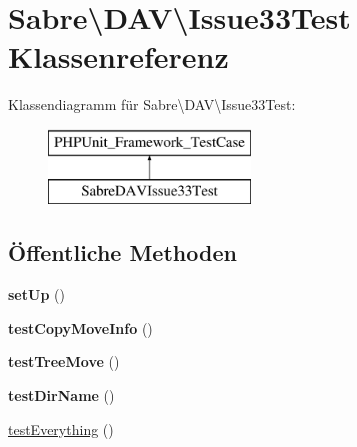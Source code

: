 \hypertarget{class_sabre_1_1_d_a_v_1_1_issue33_test}{}\section{Sabre\textbackslash{}D\+AV\textbackslash{}Issue33\+Test Klassenreferenz}
\label{class_sabre_1_1_d_a_v_1_1_issue33_test}
Klassendiagramm für Sabre\textbackslash{}D\+AV\textbackslash{}Issue33\+Test\+:\begin{figure}[H]
\begin{center}
\leavevmode
\includegraphics[height=2.000000cm]{class_sabre_1_1_d_a_v_1_1_issue33_test}
\end{center}
\end{figure}
\subsection*{Öffentliche Methoden}
\begin{DoxyCompactItemize}
\item 
\mbox{\label{class_sabre_1_1_d_a_v_1_1_issue33_test_a3ae19b56f26791c9a43c4fb60eb90247}} 
{\bfseries set\+Up} ()
\item 
\mbox{\label{class_sabre_1_1_d_a_v_1_1_issue33_test_ab1afb974b04114c0854b4436a696520f}} 
{\bfseries test\+Copy\+Move\+Info} ()
\item 
\mbox{\label{class_sabre_1_1_d_a_v_1_1_issue33_test_a6adf1fffeb111149b7c3b249c09ca3a5}} 
{\bfseries test\+Tree\+Move} ()
\item 
\mbox{\label{class_sabre_1_1_d_a_v_1_1_issue33_test_a7f62382efcfd65c30feaa8bfa73ae6ba}} 
{\bfseries test\+Dir\+Name} ()
\item 
\mbox{\hyperlink{class_sabre_1_1_d_a_v_1_1_issue33_test_aaa9bfe87de0cd229954d6c61c99a4532}{test\+Everything}} ()
\end{DoxyCompactItemize}


